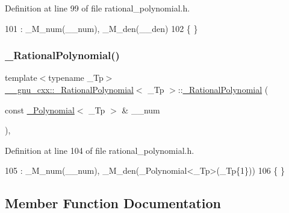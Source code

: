 Definition at line 99 of file rational\+\_\+polynomial.\+h.


\begin{DoxyCode}
101       : \_M\_num(\_\_num), \_M\_den(\_\_den)
102       \{ \}
\end{DoxyCode}
\mbox{\label{class____gnu__cxx_1_1__RationalPolynomial_ac5c31fc032a246743689ef7b86c1552f}} 
\subsubsection{\texorpdfstring{\+\_\+\+Rational\+Polynomial()}{\_RationalPolynomial()}\hspace{0.1cm}{\footnotesize\ttfamily [5/5]}}
{\footnotesize\ttfamily template$<$typename \+\_\+\+Tp$>$ \\
\hyperlink{class____gnu__cxx_1_1__RationalPolynomial}{\+\_\+\+\_\+gnu\+\_\+cxx\+::\+\_\+\+Rational\+Polynomial}$<$ \+\_\+\+Tp $>$\+::\hyperlink{class____gnu__cxx_1_1__RationalPolynomial}{\+\_\+\+Rational\+Polynomial} (\begin{DoxyParamCaption}\item[{const \hyperlink{class____gnu__cxx_1_1__Polynomial}{\+\_\+\+Polynomial}$<$ \+\_\+\+Tp $>$ \&}]{\+\_\+\+\_\+num }\end{DoxyParamCaption})\hspace{0.3cm}{\ttfamily [inline]}, {\ttfamily [explicit]}}



Definition at line 104 of file rational\+\_\+polynomial.\+h.


\begin{DoxyCode}
105       : \_M\_num(\_\_num), \_M\_den(\_Polynomial<\_Tp>(\_Tp\{1\}))
106       \{ \}
\end{DoxyCode}


\subsection{Member Function Documentation}
\mbox{\label{class____gnu__cxx_1_1__RationalPolynomial_a05e84913ccfddcf6fcbfe623cb56c937}} 
